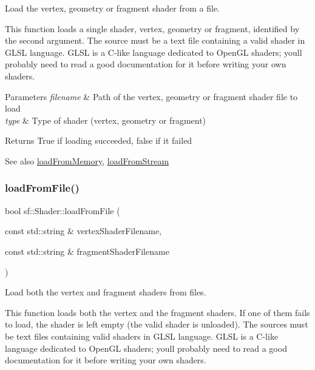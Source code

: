 Load the vertex, geometry or fragment shader from a file. 

This function loads a single shader, vertex, geometry or fragment, identified by the second argument. The source must be a text file containing a valid shader in G\+L\+SL language. G\+L\+SL is a C-\/like language dedicated to Open\+GL shaders; you\textquotesingle{}ll probably need to read a good documentation for it before writing your own shaders.


\begin{DoxyParams}{Parameters}
{\em filename} & Path of the vertex, geometry or fragment shader file to load \\
\hline
{\em type} & Type of shader (vertex, geometry or fragment)\\
\hline
\end{DoxyParams}
\begin{DoxyReturn}{Returns}
True if loading succeeded, false if it failed
\end{DoxyReturn}
\begin{DoxySeeAlso}{See also}
\hyperlink{classsf_1_1_shader_ac92d46bf71dff2d791117e4e472148aa}{load\+From\+Memory}, \hyperlink{classsf_1_1_shader_a2ee1b130c0606e4f8bcdf65c1efc2a53}{load\+From\+Stream} 
\end{DoxySeeAlso}
\mbox{\label{classsf_1_1_shader_ac9d7289966fcef562eeb92271c03e3dc}} 
\subsubsection{\texorpdfstring{load\+From\+File()}{loadFromFile()}\hspace{0.1cm}{\footnotesize\ttfamily [2/3]}}
{\footnotesize\ttfamily bool sf\+::\+Shader\+::load\+From\+File (\begin{DoxyParamCaption}\item[{const std\+::string \&}]{vertex\+Shader\+Filename,  }\item[{const std\+::string \&}]{fragment\+Shader\+Filename }\end{DoxyParamCaption})}



Load both the vertex and fragment shaders from files. 

This function loads both the vertex and the fragment shaders. If one of them fails to load, the shader is left empty (the valid shader is unloaded). The sources must be text files containing valid shaders in G\+L\+SL language. G\+L\+SL is a C-\/like language dedicated to Open\+GL shaders; you\textquotesingle{}ll probably need to read a good documentation for it before writing your own shaders.


